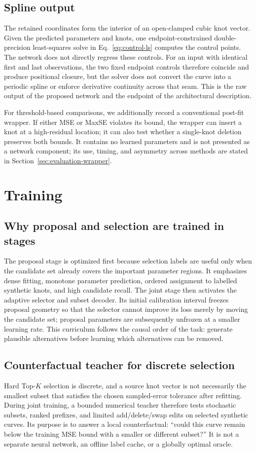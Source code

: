\documentclass[preprint,12pt]{elsarticle}
\begin{document}
\subsection{Spline output}
\label{sec:spline-output}
The retained coordinates form the interior of an open-clamped cubic knot
vector. Given the predicted parameters and knots, one endpoint-constrained
double-precision least-squares solve in Eq.~\eqref{eq:control-ls} computes the
control points. The network does not directly regress these controls. For an
input with identical first and last observations, the two fixed endpoint
controls therefore coincide and produce positional closure, but the solver
does not convert the curve into a periodic spline or enforce derivative
continuity across that seam. This is the raw output of the proposed network
and the endpoint of the architectural description.

For threshold-based comparisons, we additionally record a conventional
post-fit wrapper. If either MSE or MaxSE violates its bound, the wrapper can
insert a knot at a high-residual location; it can also test whether a
single-knot deletion preserves both bounds. It contains no learned parameters and is
not presented as a network component; its use, timing, and asymmetry across
methods are stated in Section~\ref{sec:evaluation-wrapper}.

\section{Training}
\subsection{Why proposal and selection are trained in stages}
The proposal stage is optimized first because selection labels are useful only
when the candidate set already covers the important parameter regions. It
emphasizes dense fitting, monotone parameter prediction, ordered assignment to
labelled synthetic knots, and high candidate recall. The joint stage then
activates the adaptive selector and subset decoder. Its initial calibration
interval freezes proposal geometry so that the selector cannot improve its
loss merely by moving the candidate set; proposal parameters are subsequently
unfrozen at a smaller learning rate. This curriculum follows the causal order
of the task: generate plausible alternatives before learning which alternatives
can be removed.

\subsection{Counterfactual teacher for discrete selection}
Hard Top-$K$ selection is discrete, and a source knot vector is not necessarily
the smallest subset that satisfies the chosen sampled-error tolerance after
refitting. During joint training, a bounded numerical teacher therefore tests
stochastic subsets, ranked prefixes, and limited add/delete/swap edits on
selected synthetic curves. Its purpose is to answer a local counterfactual:
``could this curve remain below the training MSE bound with a smaller or
different subset?'' It is
not a separate neural network, an offline label cache, or a globally optimal
oracle.
\end{document}
